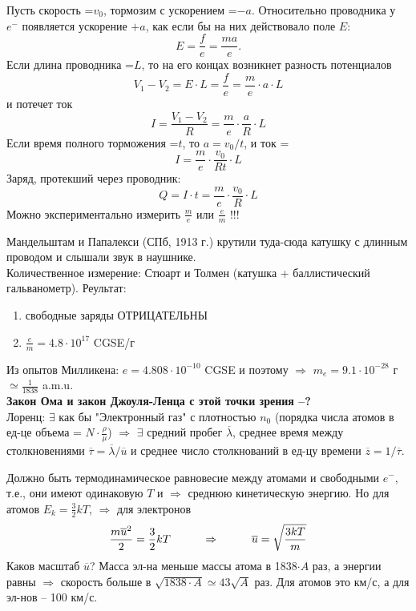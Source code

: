 \documentclass[12pt,epsfig,color,russian]{article}
\begin{document}
 Пусть скорость =$v_0$, тормозим с ускорением =$-a$. Относительно проводника у $e^-$ появляется ускорение $+a$, как если бы на них действовало поле $E$:
 \begin{displaymath}
 E=\frac{f}{e}=\frac{ma}{e}.
 \end{displaymath}
 Если длина проводника =$L$, то на его концах возникнет разность потенциалов
 \begin{displaymath}
 V_1-V_2=E\cdot L=\frac{f}{e}=\frac{m}{e}\cdot a\cdot L
 \end{displaymath}
 и потечет ток
 \begin{displaymath}
 I=\frac{V_1-V_2}{R}=\frac{m}{e}\cdot \frac{a}{R}\cdot L
 \end{displaymath}
Если время полного торможения =$t$, то $a=v_0/t$, и ток =
 \begin{displaymath}
 I=\frac{m}{e}\cdot \frac{v_0}{Rt}\cdot L
 \end{displaymath}
Заряд, протекший через проводник:\vspace{-3mm}
 \begin{displaymath}
 Q=I\cdot t=\frac{m}{e}\cdot \frac{v_0}{R}\cdot L
 \end{displaymath}
Можно экспериментально измерить $\frac{m}{e}$ или  $\frac{e}{m}$ !!!

Мандельштам и Папалекси (СПб, 1913 г.) крутили туда-сюда катушку с длинным проводом и слышали звук в наушнике.\\
Количественное измерение: Стюарт и Толмен (катушка + баллистический гальванометр). Реультат:
\begin{enumerate}
\item свободные заряды ОТРИЦАТЕЛЬНЫ
\item $\frac{e}{m}=4.8\cdot 10^{17}$ CGSE/г
\end{enumerate}
Из опытов Милликена: $e=4.808\cdot10^{-10}$ CGSE и поэтому  $\Rightarrow$ $m_e=9.1\cdot10^{-28}$ г $\simeq\frac1{1838}$ a.m.u.\\[3mm]

{\bf\Large Закон Ома и закон Джоуля-Ленца с этой точки зрения --?}\\[2mm]
Лоренц: $\exists$ как бы "Электронный газ" с плотностью $n_0$ (порядка числа атомов в ед-це объема = $N\cdot\frac{\rho}{\mu}$) $\Rightarrow$ $\exists$ средний пробег $\overline{\lambda}$, среднее время между столкновениями  $\overline{\tau}=\overline{\lambda}/\overline{u}$ и среднее число столкнований в ед-цу времени $\overline{z}=1/\overline{\tau}$.

Должно быть термодинамическое равновесие между атомами и свободными $e^-$, т.е., они имеют одинаковую $T$ и $\Rightarrow$ среднюю кинетическую энергию.  Но для атомов $E_k=\frac32kT$,  $\Rightarrow$ для электронов
 \begin{displaymath}
 \frac{m\overline{u}^2}2 = \frac32kT\hspace{10mm}\Rightarrow\hspace{10mm}\overline{u}=\sqrt{\frac{3kT}{m}}
 \end{displaymath}
Каков масштаб $\overline{u}$?  Масса эл-на меньше массы атома в 1838$\cdot A$ раз, а энергии равны  $\Rightarrow$ скорость больше в $\sqrt{1838\cdot A}\simeq 43\sqrt{A}$ раз. Для атомов это км/с, а для эл-нов -- 100 км/с.
\end{document}
